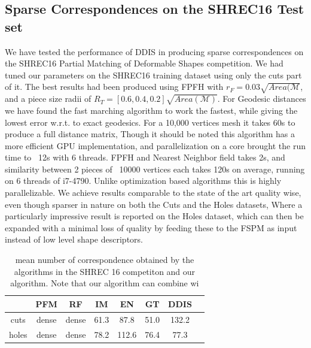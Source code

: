 \documentclass[10pt,twocolumn,letterpaper]{article}
\begin{document}
\subsection{Sparse Correspondences on the SHREC16 Test set}
We have tested the performance of DDIS in producing sparse correspondences on the SHREC16 Partial Matching of Deformable Shapes competition. 
We had tuned our parameters on the SHREC16 training dataset using only the cuts part of it. The best results had been produced using FPFH with $r_F = 0.03\sqrt{Area(\mathcal{M}}$, and a piece size radii of $R_T=[0.6,0.4,0.2]\sqrt{Area(\mathcal{M})}$. For Geodesic distances we have found the fast marching algorithm to work the fastest, while giving the lowest error w.r.t. to exact geodesics. For a 10,000 vertices mesh it takes 60s to produce a full distance matrix, Though it should be noted this algorithm has a more efficient GPU implementation, and parallelization on a core brought the run time to ~12s with 6 threads. FPFH and Nearest Neighbor field takes 2s, and similarity between 2 pieces of ~10000 vertices each takes 120s on average, running on 6 threads of i7-4790. Unlike optimization based algorithms this is highly parallelizable.
We achieve results comparable to the state of the art \cite{litany2017fully} quality wise, even though sparser in nature on both the Cuts and the Holes datasets, Where a particularly impressive result is reported on the Holes dataset, which can then be expanded with a minimal loss of quality by feeding these to the FSPM\cite{litany2017fully} as input instead of low level shape descriptors.

\begin{table}[h]
	\centering
	\setlength\tabcolsep{1.5pt}
	\begin{tabular}{c  c  c  c  c  c  c c} 
		\hline
		& PFM & RF & IM & EN & GT & DDIS  \\ \hline
		cuts & dense & dense & 61.3 & 87.8 & 51.0 & 132.2\\ \hline
		holes & dense & dense & 78.2 & 112.6 & 76.4 & 77.3 \\ \hline
		
	\end{tabular}
	\caption{mean number of correspondence obtained by the algorithms in the SHREC 16 competiton and our algorithm. Note that our algorithm can combine wi}
	\label{table:1}
\end{table}
\end{document}
